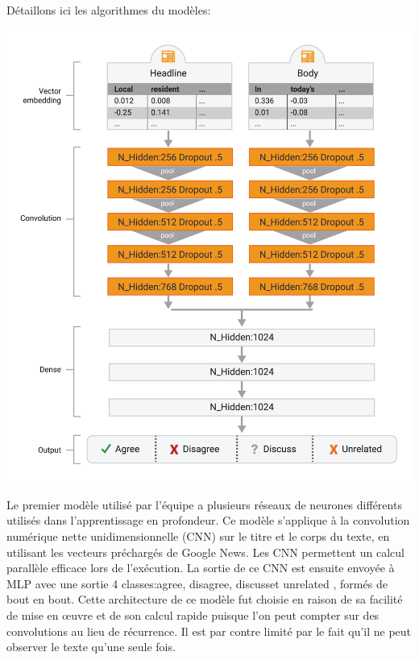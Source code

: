 \documentclass[onecolumn, 12pt]{article}
\begin{document}
Détaillons ici les algorithmes du modèles:
\begin{center}
 \includegraphics[scale=0.5]{../../img/model/solat_in_the_swen/deep_model_light.png}
 \label{fig1}
\end{center}

Le premier modèle utilisé par l'équipe a plusieurs réseaux de neurones différents utilisés dans l'apprentissage en profondeur.
Ce modèle s'applique à la convolution numérique nette unidimensionnelle (CNN) sur le titre et le corps du texte, en utilisant les vecteurs préchargés de Google News.
Les CNN permettent un calcul parallèle efficace lors de l'exécution.
La sortie de ce CNN est ensuite envoyée à  MLP avec une sortie 4 classes:\og agree\fg, \og disagree\fg, \og discuss\fg et \og unrelated \fg, formés de bout en bout.
Cette architecture de ce modèle fut choisie en raison de sa facilité de mise en œuvre et de son calcul rapide puisque l'on peut compter sur des convolutions au lieu de récurrence.
Il est par contre limité par le fait qu'il ne peut observer le texte qu'une seule fois.
\end{document}
